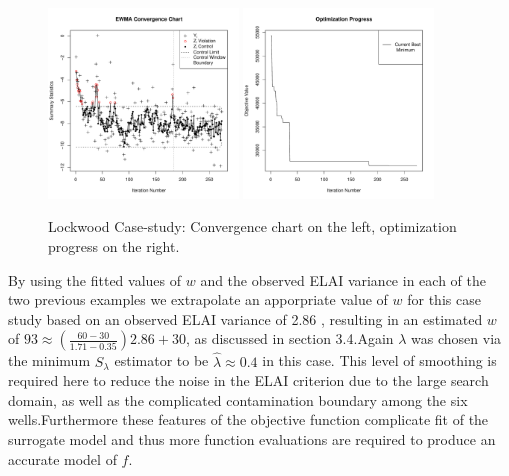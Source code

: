 \documentclass{article}
\def \roseVar {
	0.35
}
\def \rastVar {
        1.71
}
\def \lockVar {
        2.86
}
\def \lockLamb {
        0.4
}
\begin{document}

%
\begin{figure}[htb]
        \centering
        \includegraphics[width=0.45\textwidth]{./figures/ewmaConvChartLock6Three20000End.pdf}
        \includegraphics[width=0.45\textwidth]{./figures/bestZLock6Three20000End.pdf}
        \caption{Lockwood Case-study: Convergence chart on the left, optimization progress on the right.}
        \label{lock6EWMAEnd}
\end{figure}
%
%

%
By using the fitted values of $w$ and the observed ELAI variance in each of 
the two previous examples we extrapolate an apporpriate value of $w$ for this 
case study based on an observed ELAI variance of \lockVar, resulting in an 
estimated $w$ of $93\approx\left(\frac{60-30}{\rastVar-\roseVar}\right)\lockVar+30$, 
as discussed in section 3.4.Again $\lambda$ was chosen via the minimum 
$S_\lambda$ estimator to be $\hat\lambda\approx\lockLamb$ in this case. This 
level of smoothing is required here to reduce the noise in the ELAI criterion 
due to the large search domain, as well as the complicated contamination 
boundary among the six wells.Furthermore these features of the objective 
function complicate fit of the surrogate model and thus more function 
evaluations are required to produce an accurate model of $f$.
\end{document}
